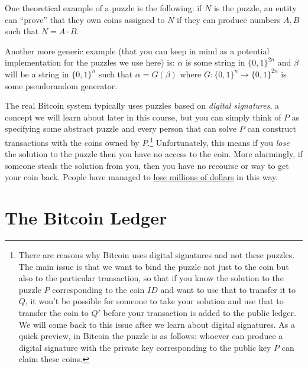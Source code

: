 
One theoretical example of a puzzle is the following: if \(N\) is the
puzzle, an entity can ``prove'' that they own coins assigned to \(N\) if
they can produce numbers \(A,B\) such that \(N=A\cdot B\).

Another more generic example (that you can keep in mind as a potential
implementation for the puzzles we use here) is: \(\alpha\) is some
string in \(\{0,1\}^{2n}\) and \(\beta\) will be a string in
\(\{0,1\}^n\) such that \(\alpha = G(\beta)\) where
\(G:\{0,1\}^n\rightarrow\{0,1\}^{2n}\) is some pseudorandom generator.

The real Bitcoin system typically uses puzzles based on \emph{digital
signatures}, a concept we will learn about later in this course, but you
can simply think of \(P\) as specifying some abstract puzzle and every
person that can solve \(P\) can construct transactions with the coins
owned by \(P\).\footnote{There are reasons why Bitcoin uses digital
  signatures and not these puzzles. The main issue is that we want to
  bind the puzzle not just to the coin but also to the particular
  transaction, so that if you know the solution to the puzzle \(P\)
  corresponding to the coin \(\ensuremath{\mathit{ID}}\) and want to use
  that to transfer it to \(Q\), it won't be possible for someone to take
  your solution and use that to transfer the coin to \(Q'\) before your
  transaction is added to the public ledger. We will come back to this
  issue after we learn about digital signatures. As a quick preview, in
  Bitcoin the puzzle is as follows: whoever can produce a digital
  signature with the private key corresponding to the public key \(P\)
  can claim these coins.} Unfortunately, this means if you \emph{lose}
the solution to the puzzle then you have no access to the coin. More
alarmingly, if someone steals the solution from you, then you have no
recourse or way to get your coin back. People have managed to
\href{http://readwrite.com/2014/01/13/what-happens-to-lost-Bitcoins}{lose
millions of dollars} in this way.

\section{The Bitcoin Ledger}\label{7-The-Bitcoin-Ledger}

